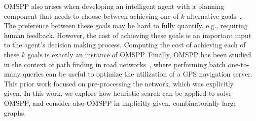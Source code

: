 \documentclass[smallextended]{svjour3}       %
\newcommand{\omspp}{\ac{OMSPP}\xspace}
\newcommand{\kxastar}{k$\times$A$^*$\xspace}
\newcommand{\roni}[1]{\textbf{[RS:#1]}}
\begin{document}
\omspp also arises when developing an intelligent agent with a planning component that needs to choose between achieving one of $k$ alternative goals~\cite{myers2007intelligent,chalupsky2001electric}. The preference between these goals may be hard to fully quantify, e.g., requiring human feedback. However, the cost of achieving these goals is an important input to the agent's decision making process. Computing the cost of achieving each of these $k$ goals is exactly an instance of \omspp{}. %
Finally, \omspp has been studied in the context of path finding in road networks~\cite{delling2011faster}, where performing batch one-to-many queries can be useful to optimize the utilization of a GPS navigation server. 
This prior work focused on pre-processing the network, which was explicitly given. In this work, we explore how heuristic search can be applied to solve \omspp, and consider also \omspp in implicitly given, combinatorially large graphs. 







\end{document}
